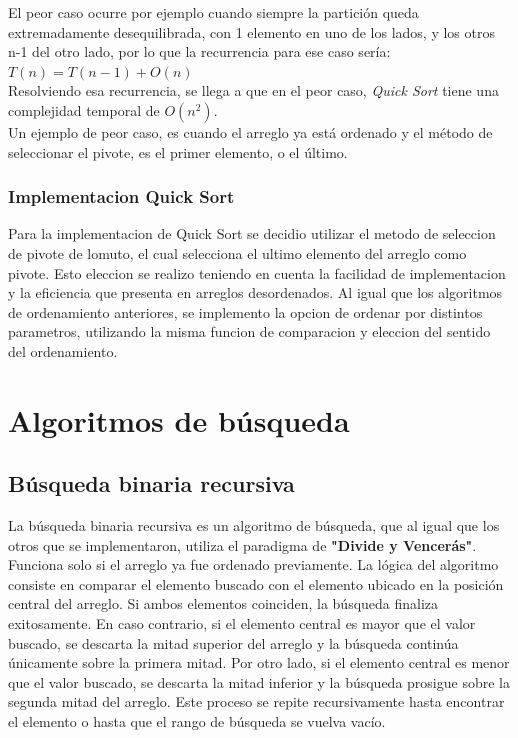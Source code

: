 El peor caso ocurre por ejemplo cuando siempre la partición queda extremadamente desequilibrada, con 1 elemento en uno de los lados, y los otros n-1 del otro lado, 
por lo que la recurrencia para ese caso sería: \\

$T(n) = T(n-1) + O(n)$ \\

Resolviendo esa recurrencia, se llega a que en el peor caso, \textit{Quick Sort} tiene una complejidad temporal de $O(n^2)$. \\

Un ejemplo de peor caso, es cuando el arreglo ya está ordenado y el método de seleccionar el pivote, es el primer elemento, o el último. \\

\subsubsection{Implementacion Quick Sort}
Para la implementacion de Quick Sort se decidio utilizar el metodo de seleccion de pivote de lomuto, el cual selecciona el ultimo elemento del arreglo como pivote.  
Esto eleccion se realizo teniendo en cuenta la facilidad de implementacion y la eficiencia que presenta en arreglos desordenados. Al igual que los algoritmos de 
ordenamiento anteriores, se implemento la opcion de ordenar por distintos parametros, utilizando la misma funcion de comparacion y eleccion del sentido del ordenamiento.

\section{Algoritmos de búsqueda}

\subsection{Búsqueda binaria recursiva}

La búsqueda binaria recursiva es un algoritmo de búsqueda, que al igual que los otros que se implementaron, utiliza el paradigma de \textbf{"Divide y Vencerás"}.  
Funciona solo si el arreglo ya fue ordenado previamente.  La lógica del algoritmo consiste en comparar el elemento buscado con el elemento ubicado en la posición
central del arreglo.  Si ambos elementos coinciden, la búsqueda finaliza exitosamente.  En caso contrario, si el elemento central es mayor que el valor buscado, 
se descarta la mitad superior del arreglo y la búsqueda continúa únicamente sobre la primera mitad.  Por otro lado, si el elemento central es menor que el valor 
buscado, se descarta la mitad inferior y la búsqueda prosigue sobre la segunda mitad del arreglo.  Este proceso se repite recursivamente hasta encontrar el 
elemento o hasta que el rango de búsqueda se vuelva vacío. \\

